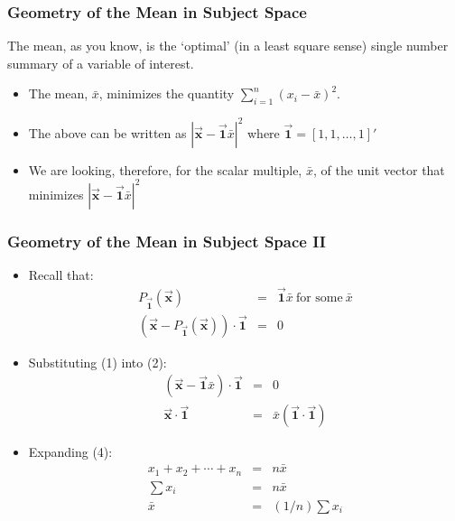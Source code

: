 \documentclass{beamer}
\begin{document}
\begin{frame}
  \frametitle{Geometry of the Mean in Subject Space}

The mean, as you know, is the `optimal' (in a least square sense) single number summary of a variable of interest. 

\begin{itemize}

\item The mean, $\bar{x}$, minimizes the quantity $\sum_{i=1}^{n}(x_i-\bar{x})^2$.

\item The above can be written as $|\vec{\mathbf{x}}-\vec{\mathbf{1}}\bar{x}|^2$ where $\vec{\mathbf{1}} = [1,1,\ldots,1]'$

\item We are looking, therefore, for the scalar multiple, $\bar{x}$, of the unit vector that minimizes $|\vec{\mathbf{x}}-\vec{\mathbf{1}}\bar{x}|^2$

\end{itemize}
\end{frame}

\begin{frame}
  \frametitle{Geometry of the Mean in Subject Space II}

\begin{itemize}
\item Recall that:
\begin{eqnarray}
P_{\vec{\mathbf{1}}}(\vec{\mathbf{x}}) & = & \vec{\mathbf{1}}\bar{x} \ \mbox{for some}\ \bar{x} \\
%
(\vec{\mathbf{x}} - P_{\vec{\mathbf{1}}}(\vec{\mathbf{x}})) \cdot \vec{\mathbf{1}} & = & 0 
\end{eqnarray}

\item Substituting (1) into (2):
\begin{eqnarray}
(\vec{\mathbf{x}} - \vec{\mathbf{1}}\bar{x}) \cdot \vec{\mathbf{1}} & = & 0 \\
%
\vec{\mathbf{x}} \cdot \vec{\mathbf{1}} & = & \bar{x} (\vec{\mathbf{1}} \cdot \vec{\mathbf{1}})
\end{eqnarray}

\item Expanding (4):
\begin{eqnarray}
x_1 + x_2 + \cdots + x_n & = & n \bar{x} \\
%
\sum x_i & = & n \bar{x} \\
%
\bar{x} & = & (1/n) \sum x_i
\end{eqnarray}

\end{itemize}


\end{frame}
\end{document}
